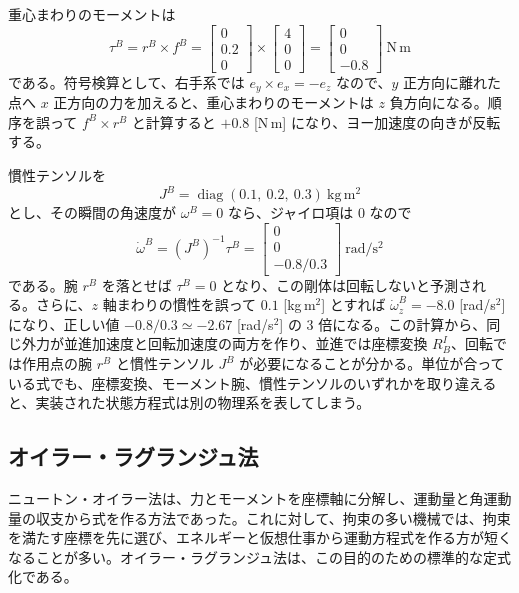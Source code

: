 \begin{example}[偏心した力を受ける剛体の瞬間加速度]
重心まわりのモーメントは
\begin{equation}
  \tau^B=r^B\times f^B
  =
  \begin{bmatrix}0\\0.2\\0\end{bmatrix}
  \times
  \begin{bmatrix}4\\0\\0\end{bmatrix}
  =
  \begin{bmatrix}0\\0\\-0.8\end{bmatrix}\ \mathrm{N\,m}
\end{equation}
である。符号検算として、右手系では $e_y\times e_x=-e_z$ なので、$y$ 正方向に離れた点へ $x$ 正方向の力を加えると、重心まわりのモーメントは $z$ 負方向になる。順序を誤って $f^B\times r^B$ と計算すると $+0.8$ [N\,m] になり、ヨー加速度の向きが反転する。

慣性テンソルを
\begin{equation}
  J^B=\operatorname{diag}(0.1,\ 0.2,\ 0.3)\ \mathrm{kg\,m^2}
\end{equation}
とし、その瞬間の角速度が $\omega^B=0$ なら、ジャイロ項は 0 なので
\begin{equation}
  \dot{\omega}^B=(J^B)^{-1}\tau^B
  =
  \begin{bmatrix}
    0\\0\\-0.8/0.3
  \end{bmatrix}\ \mathrm{rad/s^2}
\end{equation}
である。腕 $r^B$ を落とせば $\tau^B=0$ となり、この剛体は回転しないと予測される。さらに、$z$ 軸まわりの慣性を誤って $0.1$ [kg\,m$^2$] とすれば $\dot{\omega}_z^B=-8.0$ [rad/s$^2$] になり、正しい値 $-0.8/0.3\simeq-2.67$ [rad/s$^2$] の 3 倍になる。この計算から、同じ外力が並進加速度と回転加速度の両方を作り、並進では座標変換 $R^I_B$、回転では作用点の腕 $r^B$ と慣性テンソル $J^B$ が必要になることが分かる。単位が合っている式でも、座標変換、モーメント腕、慣性テンソルのいずれかを取り違えると、実装された状態方程式は別の物理系を表してしまう。
\end{example}

\subsection{オイラー・ラグランジュ法}

ニュートン・オイラー法は、力とモーメントを座標軸に分解し、運動量と角運動量の収支から式を作る方法であった。これに対して、拘束の多い機械では、拘束を満たす座標を先に選び、エネルギーと仮想仕事から運動方程式を作る方が短くなることが多い。オイラー・ラグランジュ法は、この目的のための標準的な定式化である。

